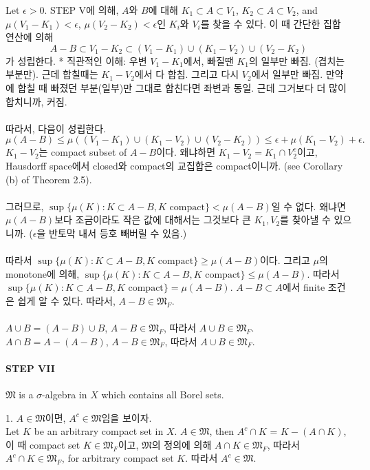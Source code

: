 \documentclass[11pt,reqno]{amsart}
\renewcommand{\(}{\left(}
\renewcommand{\)}{\right)}
\renewcommand{\[}{\left[}
\renewcommand{\]}{\right]}
\newcommand{\ep}{\epsilon}
\newcommand{\subheading}[1]{\vspace{1em}{\noindent\large\bfseries \textlangle{} #1 \textrangle{} \par}\vspace{1em}}
\newcommand{\M}{\mathfrak{M}}
\begin{document}
Let $\ep > 0$. STEP  V에 의해, $A$와 $B$에 대해 $K_1 \subset A \subset V_1$, $K_2 \subset A \subset V_2$, 
and $\mu (V_1 - K_1)<\ep$, $\mu (V_2 - K_2)<\ep$인 $K_i$와 $V_i$를 찾을 수 있다. 이 때 간단한 집합 연산에 의해
\begin{equation*}
  A - B \subset V_1 - K_2 \subset (V_1 - K_1) \cup (K_1 - V_2) \cup (V_2 - K_2)
\end{equation*} 가 성립한다.
 * 직관적인 이해: 우변 $V_1 - K_1$에서, 빠질땐 $K_1$의 일부만 빠짐. (겹치는 부분만). 근데 합칠때는 $K_1 - V_2$에서 
 다 합침. 그리고 다시 $V_2$에서 일부만 빠짐. 만약에 합칠 때 빠졌던 부분(일부)만 그대로 합친다면 좌변과 동일. 근데 그거보다
 더 많이 합치니까, 커짐. \\ \\
따라서, 다음이 성립한다.
\begin{equation}
  \mu(A-B) \le \mu((V_1 - K_1) \cup (K_1 - V_2) \cup (V_2 - K_2)) \le \ep + \mu(K_1 - V_2) + \ep.
\end{equation}
$K_1 - V_2$는 compact subset of $A-B$이다. 왜냐하면 $K_1 - V_2 = K_1 \cap V_2^c$이고, Hausdorff space에서 
closed와 compact의 교집합은 compact이니까. (see Corollary (b) of Theorem 2.5). \\ \\
그러므로, $\sup \{ \mu (K) : K \subset A-B, K \text{ compact} \} < \mu(A-B)$일 수 없다. 왜냐면 $\mu(A-B)$보다
조금이라도 작은 값에 대해서는 그것보다 큰 $K_1, V_2$를 찾아낼 수 있으니까. ($\ep$을 반토막 내서 등호 빼버릴 수 있음.) \\ \\
따라서 $\sup \{ \mu (K) : K \subset A-B, K \text{ compact} \} \ge \mu(A-B)$이다.
그리고 $\mu$의 monotone에 의해, $\sup \{ \mu (K) : K \subset A-B, K \text{ compact} \} \le \mu(A-B)$. 
따라서 $\sup \{ \mu (K) : K \subset A-B, K \text{ compact} \} = \mu(A-B)$. $A-B \subset A$에서 finite 
조건은 쉽게 알 수 있다. 따라서, $A-B \in \M_F$. \\ \\
$A \cup B = (A - B) \cup B$, $A - B \in \M_F$, 따라서 $A \cup B \in \M_F$. 
$A \cap B = A - (A - B)$, $A - B \in \M_F$, 따라서 $A \cup B \in \M_F$. 

\paragraph{STEP VII}

$\M$ is a $\sigma$-algebra in $X$ which contains all Borel sets.

\subheading{proof}

1. $A \in \M$이면, $A^c \in \M$임을 보이자. \\
Let $K$ be an arbitrary compact set in $X$.
$A \in \M$, then $A^c \cap K$ = $K - (A \cap K)$, 이 때 compact set $K \in \M_F$이고, $\M$의 정의에 의해
$A \cap K \in \M_F$, 따라서 $A^c \cap K \in \M_F$, for arbitrary compact set $K$. 따라서 $A^c \in \M$. \\ \\
\end{document}

